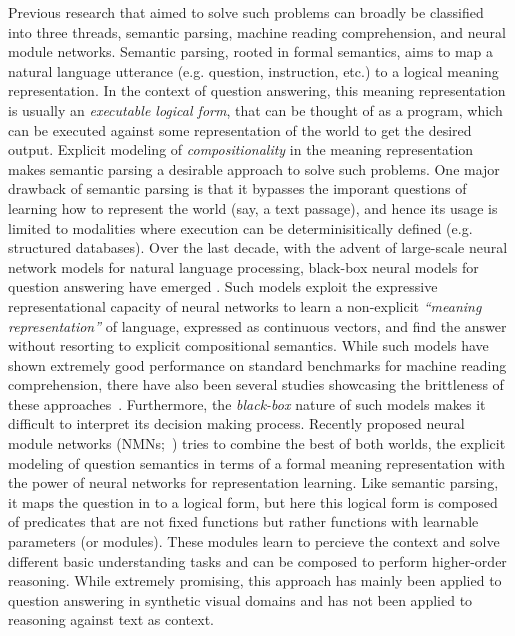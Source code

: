 \documentclass[main.tex]{subfiles}
\begin{document}
Previous research that aimed to solve such problems can broadly be classified into three threads, semantic parsing, machine reading comprehension, and neural module networks.  Semantic parsing, rooted in formal semantics, aims to map a natural language utterance (e.g. question, instruction, etc.) to a logical meaning representation.  In the context of question answering, this meaning representation is usually an \textit{executable logical form}, that can be thought of as a program, which can be executed against some representation of the world to get the desired output.  Explicit modeling of \textit{compositionality} in the meaning representation makes semantic parsing a desirable approach to solve such problems.
One major drawback of semantic parsing is that it bypasses the imporant questions of learning how to represent the world (say, a text passage), and hence its usage is limited to modalities where execution can be determinisitically defined (e.g. structured databases).
Over the last decade, with the advent of large-scale neural network models for natural language processing, black-box neural models for question answering have emerged \cite{bidaf-2016,qanet-2018,bert-2018}.
Such models exploit the expressive representational capacity of neural networks to learn a non-explicit \textit{``meaning representation''} of language, expressed as continuous vectors, and find the answer without resorting to explicit compositional semantics.  While such models have shown extremely good performance on standard benchmarks for machine reading comprehension, there have also been several studies showcasing the brittleness of these approaches~\cite{adversarial-squad-2017,sears-2018,pathologies-nlp-2018}.  Furthermore, the \textit{black-box} nature of such models makes it difficult to interpret its decision making process.
Recently proposed neural module networks (NMNs;~) tries to combine the best of both worlds, the explicit modeling of question semantics in terms of a formal meaning representation with the power of neural networks for representation learning.  Like semantic parsing, it maps the question in to a logical form, but here this logical form is composed of predicates that are not fixed functions but rather functions with learnable parameters (or modules).  These modules learn to percieve the context and solve different basic understanding tasks and can be composed to perform higher-order reasoning.  While extremely promising, this approach has mainly been applied to question answering in synthetic visual domains and has not been applied to reasoning against text as context.
\end{document}
